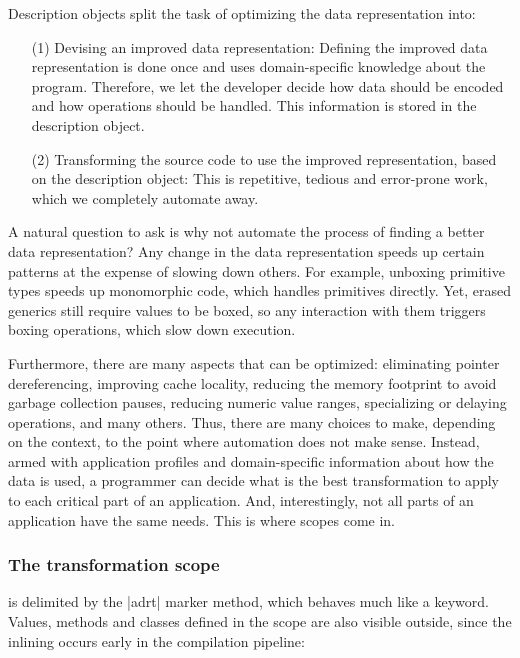 Description objects split the task of optimizing the data representation into:

\vspace{0.35em}
\begin{itemize}
\item[(1)] Devising an improved data representation: Defining the improved data representation is done once and uses domain-specific knowledge about the program. Therefore, we let the developer decide how data should be encoded and how operations should be handled. This information is stored in the description object.
\item[(2)] Transforming the source code to use the improved representation, based on the description object: This is repetitive, tedious and error-prone work, which we completely automate away.
\end{itemize}
\vspace{0.35em}

A natural question to ask is why not automate the process of finding a better data representation? Any change in the data representation speeds up certain patterns at the expense of slowing down others. For example, unboxing primitive types speeds up monomorphic code, which handles primitives directly. Yet, erased generics still require values to be boxed, so any interaction with them triggers boxing operations, which slow down execution.

Furthermore, there are many aspects that can be optimized: eliminating pointer dereferencing, improving cache locality, reducing the memory footprint to avoid garbage collection pauses, reducing numeric value ranges, specializing or delaying operations, and many others. Thus, there are many choices to make, depending on the context, to the point where automation does not make sense. Instead, armed with application profiles and domain-specific information about how the data is used, a programmer can decide what is the best transformation to apply to each critical part of an application. And, interestingly, not all parts of an application have the same needs. This is where scopes come in.

\vspace{-0.2em}

\subsubsection{The transformation scope} is delimited by the |adrt| marker method, which behaves much like a keyword. Values, methods and classes defined in the scope are also visible outside, since the inlining occurs early in the compilation pipeline:

